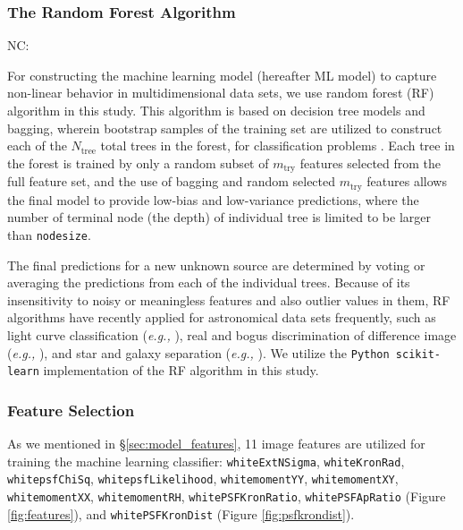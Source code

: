 \documentclass[twocolumn]{aastex62}
\newcommand{\NC}[1]{{\color{brown} NC: {#1}}}
\begin{document}
\subsubsection{The Random Forest Algorithm}\label{sec:rf_alg}
\NC{For constructing the machine learning model (hereafter ML model) 
to capture non-linear behavior in multidimensional data sets, 
we use random forest (RF) algorithm in this study.  
This algorithm is based on decision tree models \citep{Quinlan93} 
and bagging, 
wherein bootstrap samples of the training set are utilized to construct 
each of the $N_{\mathrm{tree}}$ total trees in the forest,
for classification problems \citep{Breiman96, Breiman01}. 
Each tree in the forest is trained by only a random subset of $m_{\mathrm{try}}$ 
features selected from the full feature set, 
and the use of bagging and random selected $m_{\mathrm{try}}$ features 
allows the final model to provide low-bias and low-variance predictions, 
where the number of terminal node (the depth) of individual tree is limited to be larger than \texttt{nodesize}. 

The final predictions for a new unknown source are determined by voting or averaging the predictions 
from each of the individual trees. 
Because of its insensitivity to noisy or meaningless features and also outlier values in them, 
RF algorithms have recently applied for astronomical data sets frequently, 
such as light curve classification ({\it e.g., } \citealt{Richards12a, Huppenkothen17}), 
real and bogus discrimination of difference image ({\it e.g., }  \citealt{Brink13, Wright15}), 
and star and galaxy separation ({\it e.g., } \citealt{Vasconcellos11, Miller17}). 
We utilize the \texttt{Python scikit-learn} implementation of the RF algorithm \citep{Pedregosa12} in this study. 

\subsubsection{Feature Selection}
As we mentioned in \S\ref{sec:model_features}, 11 image features are utilized for training the machine learning classifier: 
\texttt{whiteExtNSigma}, \texttt{whiteKronRad}, \texttt{whitepsfChiSq}, \texttt{whitepsfLikelihood}, 
\texttt{whitemomentYY}, \texttt{whitemomentXY}, \texttt{whitemomentXX}, \texttt{whitemomentRH}, 
\texttt{whitePSFKronRatio}, \texttt{whitePSFApRatio} (Figure \ref{fig:features}), 
and \texttt{whitePSFKronDist} (Figure \ref{fig:psfkrondist}). 

}
\end{document}
